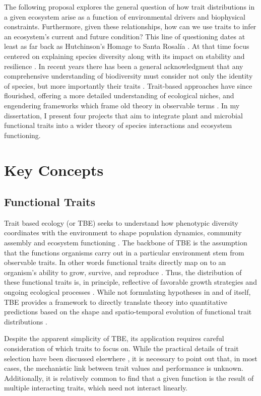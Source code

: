 The following proposal explores the general question of how trait distributions in a given ecosystem arise as a function of environmental drivers and biophysical constraints. Furthermore, given these relationships, how can we use traits to infer an ecosystem's current and future condition?  This line of questioning dates at least as far back as Hutchinson's Homage to Santa Rosalía \cite{hutchinson1959a}. At that time focus centered on explaining species diversity along with its impact on stability and resilience \cite{loreau2010a}. In recent years there has been a general acknowledgment that any comprehensive understanding of biodiversity must consider not only the identity of species, but more importantly their traits \cite{enquist2015a, lavorel_predicting_2002, petchey_functional_2006}. Trait-based approaches have since flourished, offering a more detailed understanding of ecological niches, and engendering frameworks which frame old theory in observable terms \cite{chac2023a}. In my dissertation, I present four projects that aim to integrate plant and microbial functional traits into a wider theory of species interactions and ecosystem functioning. 

\section{Key Concepts}

\subsection{Functional Traits}

Trait based ecology (or TBE) seeks to understand how phenotypic diversity coordinates with the environment to shape population dynamics, community assembly and ecosystem functioning \cite{chac2023a}. The backbone of TBE is the assumption that the functions organisms carry out in a particular environment stem from observable traits. In other words functional traits directly map on to an organism's ability to grow, survive, and reproduce \cite{grime1988a}. Thus, the distribution of these functional traits is, in principle, reflective of favorable growth strategies and ongoing ecological processes \cite{norberg_phenotypic_2001}. While not formulating hypotheses in and of itself, TBE provides a framework to directly translate theory into quantitative predictions based on the shape and spatio-temporal evolution of functional trait distributions \cite{enquist2015a}.

Despite the apparent simplicity of TBE, its application requires careful consideration of which traits to focus on. While the practical details of trait selection have been discussed elsewhere \cite{chac2023a}, it is necessary to point out that, in most cases, the mechanistic link between trait values and performance is unknown. Additionally, it is relatively common to find that a given function is the result of multiple interacting traits, which need not interact linearly. 

